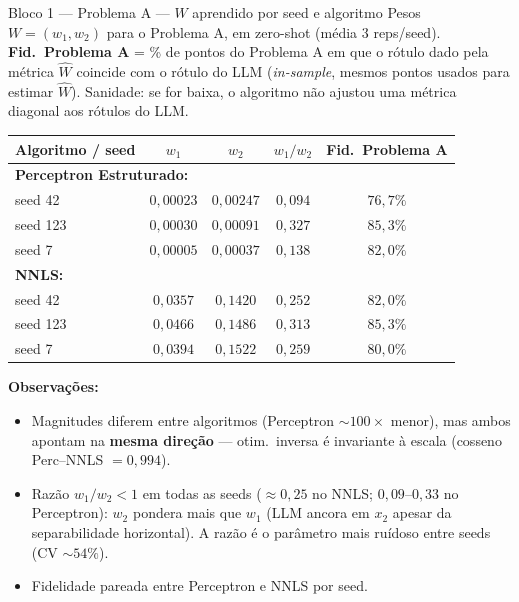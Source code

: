 \documentclass[aspectratio=169,10pt]{beamer}
\begin{document}
\begin{frame}{Bloco 1 --- Problema A --- $W$ aprendido por seed e algoritmo}
  \scriptsize
  Pesos $W = (w_1, w_2)$ para o Problema A, em zero-shot (m\'edia 3 reps/seed).
  \\[2pt]
  \textbf{Fid.\ Problema A} = \% de pontos do Problema A em que o r\'otulo dado pela m\'etrica $\hat W$ coincide com o r\'otulo do LLM (\emph{in-sample}, mesmos pontos usados para estimar $\hat W$). Sanidade: se for baixa, o algoritmo n\~ao ajustou uma m\'etrica diagonal aos r\'otulos do LLM.
  \begin{center}
  \begin{tabular}{lccc c}
    \toprule
    Algoritmo / seed & $w_1$ & $w_2$ & $w_1/w_2$ & Fid.\ Problema A \\
    \midrule
    \multicolumn{5}{l}{\textbf{Perceptron Estruturado:}} \\
    seed 42  & $0{,}00023$ & $0{,}00247$ & $0{,}094$ & $76{,}7\%$ \\
    seed 123 & $0{,}00030$ & $0{,}00091$ & $0{,}327$ & $85{,}3\%$ \\
    seed 7   & $0{,}00005$ & $0{,}00037$ & $0{,}138$ & $82{,}0\%$ \\
    \midrule
    \multicolumn{5}{l}{\textbf{NNLS:}} \\
    seed 42  & $0{,}0357$ & $0{,}1420$ & $0{,}252$ & $82{,}0\%$ \\
    seed 123 & $0{,}0466$ & $0{,}1486$ & $0{,}313$ & $85{,}3\%$ \\
    seed 7   & $0{,}0394$ & $0{,}1522$ & $0{,}259$ & $80{,}0\%$ \\
    \bottomrule
  \end{tabular}
  \end{center}
  \medskip
  \textbf{Observa\c{c}\~oes:}
  \begin{itemize}\setlength\itemsep{0.05em}
    \item Magnitudes diferem entre algoritmos (Perceptron $\sim 100\times$ menor), mas ambos apontam na \textbf{mesma dire\c{c}\~ao} --- otim.\ inversa \'e invariante \`a escala (cosseno Perc--NNLS $= 0{,}994$).
    \item Raz\~ao $w_1/w_2 < 1$ em todas as seeds ($\approx 0{,}25$ no NNLS; $0{,}09$--$0{,}33$ no Perceptron): $w_2$ pondera mais que $w_1$ (LLM ancora em $x_2$ apesar da separabilidade horizontal). A raz\~ao \'e o par\^ametro mais ru\'idoso entre seeds (CV $\sim 54\%$).
    \item Fidelidade pareada entre Perceptron e NNLS por seed.
  \end{itemize}
\end{frame}
\end{document}
